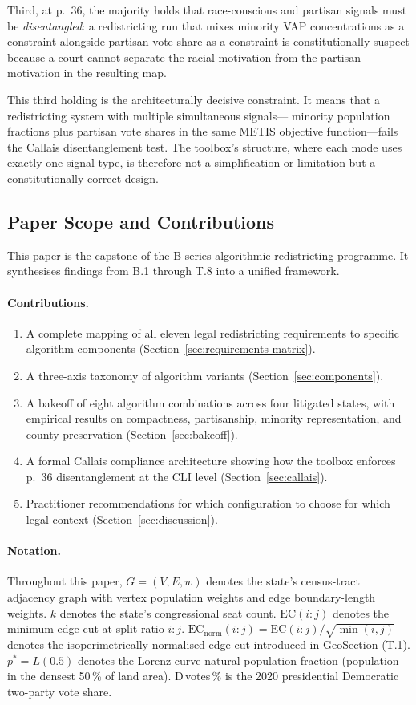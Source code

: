 Third, at p.~36, the majority holds that race-conscious and partisan signals
must be \emph{disentangled}: a redistricting run that mixes minority VAP
concentrations as a constraint alongside partisan vote share as a constraint
is constitutionally suspect because a court cannot separate the racial motivation
from the partisan motivation in the resulting map.

This third holding is the architecturally decisive constraint.
It means that a redistricting system with multiple simultaneous signals---
minority population fractions plus partisan vote shares in the same METIS
objective function---fails the Callais disentanglement test.
The toolbox's structure, where each mode uses exactly one signal type, is
therefore not a simplification or limitation but a constitutionally correct design.

\subsection{Paper Scope and Contributions}

This paper is the capstone of the B-series algorithmic redistricting programme.
It synthesises findings from B.1 through T.8 into a unified framework.

\paragraph{Contributions.}
\begin{enumerate}
  \item A complete mapping of all eleven legal redistricting requirements to
    specific algorithm components (Section~\ref{sec:requirements-matrix}).
  \item A three-axis taxonomy of algorithm variants (Section~\ref{sec:components}).
  \item A bakeoff of eight algorithm combinations across four litigated states,
    with empirical results on compactness, partisanship, minority representation,
    and county preservation (Section~\ref{sec:bakeoff}).
  \item A formal Callais compliance architecture showing how the toolbox
    enforces p.~36 disentanglement at the CLI level (Section~\ref{sec:callais}).
  \item Practitioner recommendations for which configuration to choose for which
    legal context (Section~\ref{sec:discussion}).
\end{enumerate}

\paragraph{Notation.}
Throughout this paper, $G = (V, E, w)$ denotes the state's census-tract
adjacency graph with vertex population weights and edge boundary-length weights.
$k$ denotes the state's congressional seat count.
$\mathrm{EC}(i:j)$ denotes the minimum edge-cut at split ratio $i:j$.
$\mathrm{EC}_\text{norm}(i:j) = \mathrm{EC}(i:j) / \sqrt{\min(i,j)}$ denotes
the isoperimetrically normalised edge-cut introduced in GeoSection (T.1).
$p^* = L(0.5)$ denotes the Lorenz-curve natural population fraction
(population in the densest 50\,\% of land area).
D\,votes\,\% is the 2020 presidential Democratic two-party vote share.
